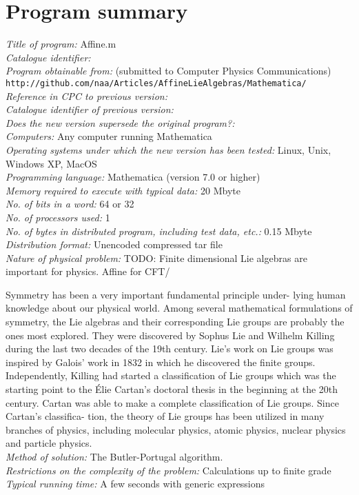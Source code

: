 \documentclass[12pt]{article}
\theoremstyle{definition}
\begin{document}
{\footnotesize
\section*{Program summary}
\textit{Title of program:} Affine.m
\\
\textit{Catalogue identifier:}
\\
\textit{Program obtainable from:} (submitted to Computer Physics Communications) \\
\mbox{}\qquad \texttt{http://github.com/naa/Articles/AffineLieAlgebras/Mathematica/}
\\
\textit{Reference in CPC to previous version:} 
\\
\textit{Catalogue identifier of previous version:}
\\
\textit{Does the new version supersede the original program?:}
\\
\textit{Computers:} Any computer running Mathematica
\\
\textit{Operating systems under which the new version has been
tested:} Linux, Unix, Windows XP, MacOS
\\
\textit{Programming language:} Mathematica (version 7.0 or higher)
\\
\textit{Memory required to execute with typical data:} 20 Mbyte
\\
\textit{No. of bits in a word:} 64 or 32
\\
\textit{No. of processors used:} 1
\\
\textit{No. of bytes in distributed program, including test data,
etc.:} 0.15 Mbyte
\\
\textit{Distribution format:} Unencoded compressed tar file
\\
\textit{Nature of physical problem:} 
TODO: Finite dimensional Lie algebras are important for physics. Affine for CFT/

Symmetry has been a very important fundamental principle under-
lying human knowledge about our physical world. Among several
mathematical formulations of symmetry, the Lie algebras and their
corresponding Lie groups are probably the ones most explored.
They were discovered by Sophus Lie and Wilhelm Killing during
the last two decades of the 19th century. Lie’s work on Lie groups
was inspired by Galois’ work in 1832 in which he discovered the
ﬁnite groups. Independently, Killing had started a classiﬁcation of
Lie groups which was the starting point to the Élie Cartan’s doctoral
thesis in the beginning at the 20th century. Cartan was able to make
a complete classiﬁcation of Lie groups. Since Cartan’s classiﬁca-
tion, the theory of Lie groups has been utilized in many branches
of physics, including molecular physics, atomic physics, nuclear
physics and particle physics.
\\
\textit{Method of solution:} The Butler-Portugal algorithm.
\\
\textit{Restrictions on the complexity of the problem:}
Calculations up to finite grade
\\
\textit{Typical running time:} A few seconds with generic expressions

%
}
\end{document}

